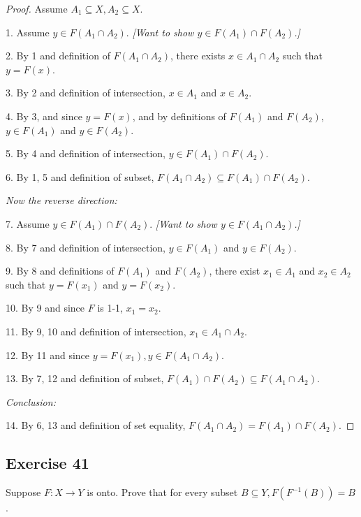 \documentclass[14pt]{extarticle}
\begin{document}
\begin{proof}
    Assume \(A_1 \subseteq X, A_2 \subseteq X\).

    1. Assume \(y \in F(A_1 \cap A_2)\). {\it [Want to show \(y \in F(A_1) \cap F(A_2)\).]}

    2. By 1 and definition of \(F(A_1 \cap A_2)\), there exists \(x \in A_1 \cap A_2\) such that \(y = F(x)\).

    3. By 2 and definition of intersection, \(x \in A_1\) and \(x \in A_2\).

    4. By 3, and since $y = F(x)$, and by definitions of $F(A_1)$ and $F(A_2)$, \(y \in F(A_1)\) and \(y \in F(A_2)\).

    5. By 4 and definition of intersection, \(y \in F(A_1) \cap F(A_2)\).

    6. By 1, 5 and definition of subset, \(F(A_1 \cap A_2) \subseteq F(A_1) \cap F(A_2)\).

        {\it Now the reverse direction:}

    7. Assume \(y \in F(A_1) \cap F(A_2)\). {\it [Want to show \(y \in F(A_1 \cap A_2)\).]}

    8. By 7 and definition of intersection, \(y \in F(A_1)\) and \(y \in F(A_2)\).

    9. By 8 and definitions of \(F(A_1)\) and \(F(A_2)\), there exist \(x_1 \in A_1\) and \(x_2 \in A_2\) such that \(y = F(x_1)\) and \(y = F(x_2)\).

    10. By 9 and since $F$ is 1-1, \(x_1 = x_2\).

    11. By 9, 10 and definition of intersection, \(x_1 \in A_1 \cap A_2\).

    12. By 11 and since \(y = F(x_1), y \in F(A_1 \cap A_2)\).

    13. By 7, 12 and definition of subset, \(F(A_1) \cap F(A_2) \subseteq F(A_1 \cap A_2)\).

        {\it Conclusion:}

    14. By 6, 13 and definition of set equality, \(F(A_1 \cap A_2) = F(A_1) \cap F(A_2)\).
\end{proof}

\subsection{Exercise 41}
Suppose \(F: X \to Y\) is onto. Prove that for every subset \(B \subseteq Y, F(F^{-1}(B)) = B\).
\end{document}
